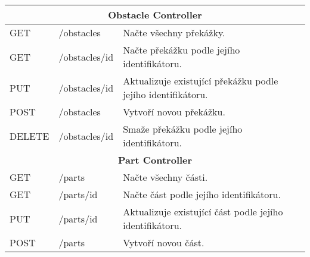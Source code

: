 \begin{longtable}{|l|l|p{}|}
    \hline
    \multicolumn{3}{|c|}{\textbf{Obstacle Controller}}                                                                                                                                                    \\
    \hline
    GET             & /obstacles                             & Načte všechny překážky.                                                                                                                    \\
    GET             & /obstacles/{id}                        & Načte překážku podle jejího identifikátoru.                                                                                                \\
    PUT             & /obstacles/{id}                        & Aktualizuje existující překážku podle jejího identifikátoru.                                                                               \\
    POST            & /obstacles                             & Vytvoří novou překážku.                                                                                                                    \\
    DELETE          & /obstacles/{id}                        & Smaže překážku podle jejího identifikátoru.                                                                                                \\
    \hline
    \multicolumn{3}{|c|}{\textbf{Part Controller}}                                                                                                                                                        \\
    \hline
    GET             & /parts                                 & Načte všechny části.                                                                                                                       \\
    GET             & /parts/{id}                            & Načte část podle jejího identifikátoru.                                                                                                    \\
    PUT             & /parts/{id}                            & Aktualizuje existující část podle jejího identifikátoru.                                                                                   \\
    POST            & /parts                                 & Vytvoří novou část.                                                                                                                        \\

\end{longtable}
